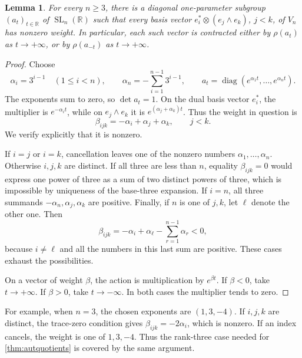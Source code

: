 \documentclass[11pt,a4paper]{article}
\newtheorem{lemma}[theorem]{Lemma}
\theoremstyle{definition}
\newcommand{\R}{\mathbb R}
\newcommand{\SL}{\operatorname{SL}}
\begin{document}
\begin{lemma}\label{lem:autweights}
For every \(n\ge3\), there is a diagonal one-parameter subgroup
\((a_t)_{t\in\R}\) of \(\SL_n(\R)\) such that every basis
vector \(e_i^*\otimes(e_j\wedge e_k)\), \(j<k\), of \(V_n\)
has nonzero weight. In particular, each such vector is
contracted either by \(\rho(a_t)\) as \(t\to+\infty\), or
by \(\rho(a_{-t})\) as \(t\to+\infty\).
\end{lemma}
\begin{proof}
Choose
\[
 \alpha_i=3^{i-1}\quad(1\le i<n),
 \qquad
 \alpha_n=-\sum_{i=1}^{n-1}3^{i-1},
 \qquad
 a_t=\operatorname{diag}
       (e^{\alpha_1t},\ldots,e^{\alpha_nt}).
\]
The exponents sum to zero, so \(\det a_t=1\). On the dual
basis vector \(e_i^*\), the multiplier is
\(e^{-\alpha_it}\), while on \(e_j\wedge e_k\) it is
\(e^{(\alpha_j+\alpha_k)t}\). Thus the weight in question is
\[
 \beta_{ijk}=-\alpha_i+\alpha_j+\alpha_k,
 \qquad j<k.
\]
We verify explicitly that it is nonzero.

If \(i=j\) or \(i=k\), cancellation leaves one of the
nonzero numbers \(\alpha_1,\ldots,\alpha_n\). Otherwise
\(i,j,k\) are distinct. If all three are less than \(n\),
equality \(\beta_{ijk}=0\) would express one power of three
as a sum of two distinct powers of three, which is impossible
by uniqueness of the base-three expansion. If \(i=n\), all
three summands \(-\alpha_n,\alpha_j,\alpha_k\) are positive.
Finally, if \(n\) is one of \(j,k\), let \(\ell\) denote the
other one. Then
\[
 \beta_{ijk}
 =-\alpha_i+\alpha_\ell
       -\sum_{r=1}^{n-1}\alpha_r<0,
\]
because \(i\ne\ell\) and all the numbers in this last sum
are positive. These cases exhaust the possibilities.

On a vector of weight \(\beta\), the action is multiplication
by \(e^{\beta t}\). If \(\beta<0\), take \(t\to+\infty\).
If \(\beta>0\), take \(t\to-\infty\). In both cases the
multiplier tends to zero.
\end{proof}

For example, when \(n=3\), the chosen exponents are
\((1,3,-4)\). If \(i,j,k\) are distinct, the trace-zero
condition gives \(\beta_{ijk}=-2\alpha_i\), which is
nonzero. If an index cancels, the weight is one of
\(1,3,-4\). Thus the rank-three case needed for
\cref{thm:autquotients} is covered by the same argument.
\end{document}
